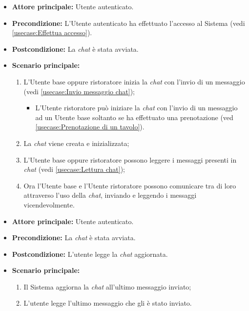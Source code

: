 \label{usecase:Comunicazione attraverso chat}
\begin{itemize}
	\item \textbf{Attore principale:} Utente autenticato.

	\item \textbf{Precondizione:} L'Utente autenticato ha effettuato l'accesso al Sistema (vedi \autoref{usecase:Effettua accesso}).

	\item \textbf{Postcondizione:} La \textit{chat} è stata avviata.

	\item \textbf{Scenario principale:}
	      \begin{enumerate}
		      \item L'Utente base oppure ristoratore inizia la \textit{chat} con l'invio di un messaggio (vedi \autoref{usecase:Invio messaggio chat});
		            \begin{itemize}
			            \item L'Utente ristoratore può iniziare la \textit{chat} con l'invio di un messaggio ad un Utente base soltanto se ha effettuato una prenotazione (ved \autoref{usecase:Prenotazione di un tavolo}).
		            \end{itemize}
		      \item La \textit{chat} viene creata e inizializzata;
		      \item L'Utente base oppure ristoratore possono leggere i messaggi presenti in \textit{chat} (vedi \autoref{usecase:Lettura chat});
		      \item Ora l'Utente base e l'Utente ristoratore possono comunicare tra di loro attraverso l'uso della \textit{chat}, inviando e leggendo i messaggi vicendevolmente.
	      \end{enumerate}
\end{itemize}

\label{usecase:Lettura chat}
\begin{itemize}
	\item \textbf{Attore principale:} Utente autenticato.

	\item \textbf{Precondizione:} La \textit{chat} è stata avviata.

	\item \textbf{Postcondizione:} L'utente legge la \textit{chat} aggiornata.

	\item \textbf{Scenario principale:}
	      \begin{enumerate}
		      \item Il Sistema aggiorna la \textit{chat} all'ultimo messaggio inviato;
		      \item L'utente legge l'ultimo messaggio che gli è stato inviato.
	      \end{enumerate}
\end{itemize}


